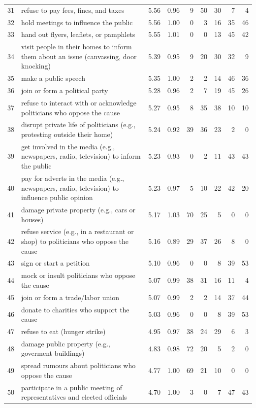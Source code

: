 \documentclass[12pt, letterpaper]{article}
\begin{document}
\begin{xltabular}{\linewidth}{rXrrrrrrr}
31 & refuse to pay fees, fines, and taxes & 5.56 & 0.96 & 9 & 50 & 30 & 7 & 4\\
32 & hold meetings to influence the public & 5.56 & 1.00 & 0 & 3 & 16 & 35 & 46\\
33 & hand out flyers, leaflets, or pamphlets & 5.55 & 1.01 & 0 & 0 & 13 & 45 & 42\\
34 & visit people in their homes to inform them about an issue (canvassing, door knocking) & 5.39 & 0.95 & 9 & 20 & 30 & 32 & 9\\
35 & make a public speech & 5.35 & 1.00 & 2 & 2 & 14 & 46 & 36\\

36 & join or form a political party & 5.28 & 0.96 & 2 & 7 & 19 & 45 & 26\\
37 & refuse to interact with or acknowledge politicians who oppose the cause & 5.27 & 0.95 & 8 & 35 & 38 & 10 & 10\\
38 & disrupt private life of politicians (e.g., protesting outside their home) & 5.24 & 0.92 & 39 & 36 & 23 & 2 & 0\\
39 & get involved in the media (e.g., newspapers, radio, television) to inform the public & 5.23 & 0.93 & 0 & 2 & 11 & 43 & 43\\
40 & pay for adverts in the media (e.g., newspapers, radio, television) to influence public opinion & 5.23 & 0.97 & 5 & 10 & 22 & 42 & 20\\

41 & damage private property (e.g., cars or houses) & 5.17 & 1.03 & 70 & 25 & 5 & 0 & 0\\
42 & refuse service (e.g., in a restaurant or shop) to politicians who oppose the cause & 5.16 & 0.89 & 29 & 37 & 26 & 8 & 0\\
43 & sign or start a petition & 5.10 & 0.96 & 0 & 0 & 8 & 39 & 53\\
44 & mock or insult politicians who oppose the cause & 5.07 & 0.99 & 38 & 31 & 16 & 11 & 4\\
45 & join or form a trade/labor union & 5.07 & 0.99 & 2 & 2 & 14 & 37 & 44\\

46 & donate to charities who support the cause & 5.03 & 0.96 & 0 & 0 & 8 & 39 & 53\\
47 & refuse to eat (hunger strike) & 4.95 & 0.97 & 38 & 24 & 29 & 6 & 3\\
48 & damage public property (e.g., goverment buildings) & 4.83 & 0.98 & 72 & 20 & 5 & 2 & 0\\
49 & spread rumours about politicians who oppose the cause & 4.77 & 1.00 & 69 & 21 & 10 & 0 & 0\\
50 & participate in a public meeting of representatives and elected officials & 4.70 & 1.00 & 3 & 0 & 7 & 47 & 43\\


\end{xltabular}
\end{document}
